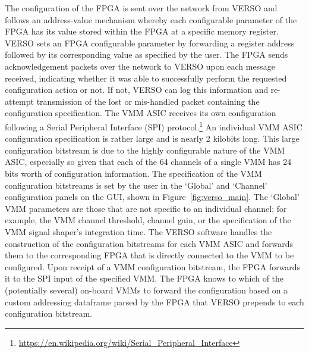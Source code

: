 \noindent The configuration of the FPGA is sent over the network from VERSO and
follows an address-value mechanism whereby each configurable parameter of the FPGA has its
value stored within the FPGA at a specific memory register.
VERSO sets an FPGA configurable parameter by forwarding a register address followed by its corresponding
value as specified by the user.
The FPGA sends acknowledgement packets over the network to VERSO upon each message received,
indicating whether it was able to successfully perform the requested configuration action or not.
If not, VERSO can log this information and re-attempt transmission of the lost or mis-handled packet
containing the configuration specification.
The VMM ASIC receives its own configuration following a Serial Peripheral Interface (SPI) protocol.\footnote{\url{https://en.wikipedia.org/wiki/Serial_Peripheral_Interface}}
An individual VMM ASIC configuration specification is rather large and is nearly 2 kilobits long.
This large configuration bitstream is due to the highly configurable nature of the VMM ASIC, especially
so given that each of the 64 channels of a single VMM has 24 bits worth of configuration information.
The specification of the VMM configuration bitstreams is set by the user in the `Global' and `Channel' configuration
panels on the GUI, shown in Figure~\ref{fig:verso_main}.
The `Global' VMM parameters are those that are not specific to an individual channel; for example,
the VMM channel threshold, channel gain, or the specification of the VMM signal shaper's integration time.
The VERSO software handles the construction of the configuration bitstreams for each VMM ASIC and forwards
them to the corresponding FPGA that is directly connected to the VMM to be configured.
Upon receipt of a VMM configuration bitstream, the FPGA forwards it to the SPI input of the specified VMM.
The FPGA knows to which of the (potentially several) on-board VMMs to forward the configuration based on
a custom addressing dataframe parsed by the FPGA that VERSO prepends to each configuration bitstream.

